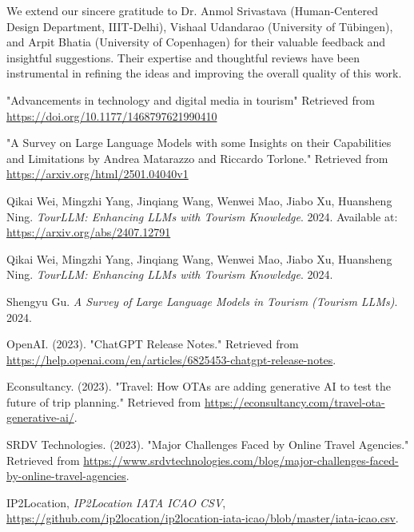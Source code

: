 \documentclass[final,3p,times,authoryear]{elsarticle}
\begin{document}
    We extend our sincere gratitude to Dr. Anmol Srivastava (Human-Centered Design Department, IIIT-Delhi), Vishaal Udandarao (University of Tübingen), and Arpit Bhatia (University of Copenhagen) for their valuable feedback and insightful suggestions. Their expertise and thoughtful reviews have been instrumental in refining the ideas and improving the overall quality of this work.

\newpage

\begin{thebibliography}{99}
    
     "Advancements in technology and digital media in tourism" Retrieved from \url{https://doi.org/10.1177/1468797621990410}
    
     "A Survey on Large Language Models with some Insights on their Capabilities and Limitations by Andrea Matarazzo and Riccardo Torlone." Retrieved from \url{https://arxiv.org/html/2501.04040v1}
    
     Qikai Wei, Mingzhi Yang, Jinqiang Wang, Wenwei Mao, Jiabo Xu, Huansheng Ning. \textit{TourLLM: Enhancing LLMs with Tourism Knowledge}. 2024. Available at: \url{https://arxiv.org/abs/2407.12791}
    
     Qikai Wei, Mingzhi Yang, Jinqiang Wang, Wenwei Mao, Jiabo Xu, Huansheng Ning. \textit{TourLLM: Enhancing LLMs with Tourism Knowledge}. 2024.
    
     Shengyu Gu. \textit{A Survey of Large Language Models in Tourism (Tourism LLMs)}. 2024.
    
        OpenAI. (2023). "ChatGPT Release Notes." Retrieved from \url{https://help.openai.com/en/articles/6825453-chatgpt-release-notes}.

        Econsultancy. (2023). "Travel: How OTAs are adding generative AI to test the future of trip planning." Retrieved from \url{https://econsultancy.com/travel-ota-generative-ai/}.

        SRDV Technologies. (2023). "Major Challenges Faced by Online Travel Agencies." Retrieved from \url{https://www.srdvtechnologies.com/blog/major-challenges-faced-by-online-travel-agencies}.

        IP2Location, \emph{IP2Location IATA ICAO CSV}, \href{https://github.com/ip2location/ip2location-iata-icao/blob/master/iata-icao.csv}{https://github.com/ip2location/ip2location-iata-icao/blob/master/iata-icao.csv}.


\end{thebibliography}
\end{document}
